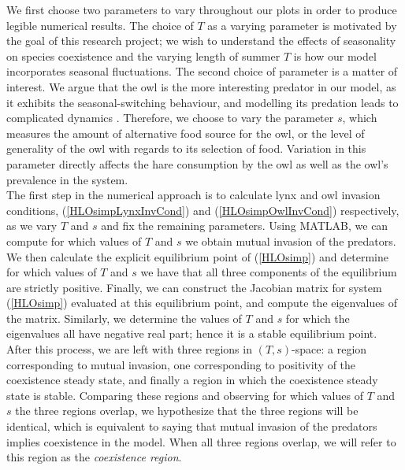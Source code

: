 \documentclass[12pt]{UOthesis}
\theoremstyle{remarkstyle}
\begin{document}
We first choose two parameters to vary throughout our plots in order to produce legible numerical results. The choice of $T$ as a varying parameter is motivated by the goal of this research project; we wish to understand the effects of seasonality on species coexistence and the varying length of summer $T$ is how our model incorporates seasonal fluctuations. The second choice of parameter is a matter of interest. We argue that the owl is the more interesting predator in our model, as it exhibits the seasonal-switching behaviour, and modelling its predation leads to complicated dynamics \cite{TysonLutscher}. Therefore, we choose to vary the parameter $s$, which measures the amount of alternative food source for the owl, or the level of generality of the owl with regards to its selection of food. Variation in this parameter directly affects the hare consumption by the owl as well as the owl's prevalence in the system. \\

The first step in the numerical approach is to calculate lynx and owl invasion conditions, (\ref{HLOsimpLynxInvCond}) and (\ref{HLOsimpOwlInvCond}) respectively, as we vary  $T$ and $s$ and fix the remaining parameters. Using MATLAB, we can compute for which values of $T$ and $s$ we obtain mutual invasion of the predators. We then calculate the explicit equilibrium point of (\ref{HLOsimp}) and determine for which values of $T$ and $s$ we have that all three components of the equilibrium are strictly positive. Finally, we can construct the Jacobian matrix for system (\ref{HLOsimp}) evaluated at this equilibrium point, and compute the eigenvalues of the matrix. Similarly, we determine the values of $T$ and $s$ for which the eigenvalues all have negative real part; hence it is a stable equilibrium point.\\

After this process, we are left with three regions in $(T,s)$-space: a region corresponding to mutual invasion, one corresponding to positivity of the coexistence steady state, and finally a region in which the coexistence steady state is stable. Comparing these regions and observing for which values of $T$ and $s$ the three regions overlap, we hypothesize that the three regions will be identical, which is equivalent to saying that mutual invasion of the predators implies coexistence in the model. When all three regions overlap, we will refer to this region as the \textit{coexistence region}.\\
\end{document}
